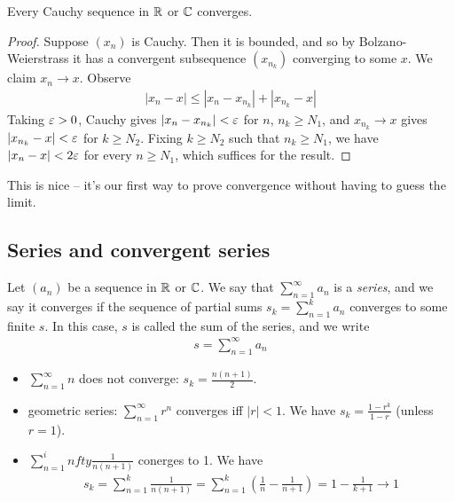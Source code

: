 \documentclass{../../template/note}
\begin{document}
    \begin{theorem}
        Every Cauchy sequence in \(\mathbb R\) or \(\mathbb C\) converges.
    \end{theorem}
    
    \begin{proof}
        Suppose \((x_n)\) is Cauchy. Then it is bounded, and so by Bolzano-Weierstrass it has a convergent subsequence \((x_{n_k})\) converging to some \(x\). We claim \(x_n \to x\). Observe
        \begin{align*}
            |x_n - x| \leq |x_n - x_{n_k}| + |x_{n_k} - x|
        \end{align*}
        Taking \(\varepsilon > 0\), Cauchy gives \(|x_n - x_{n_k}| < \varepsilon\) for \(n\), \(n_k \geq N_1\), and \(x_{n_k} \to x\) gives \(|x_{n_k} - x| < \varepsilon\) for \(k \geq N_2\). Fixing \(k \geq N_2\) such that \(n_k \geq N_1\), we have \(|x_n - x| < 2\varepsilon\) for every \(n \geq N_1\), which suffices for the result.        
    \end{proof}
    
    \begin{remark*}
        This is nice -- it's our first way to prove convergence without having to guess the limit.
    \end{remark*}
    
    \subsection{Series and convergent series}

    \begin{definition}
        Let \((a_n)\) be a sequence in \(\mathbb R\) or \(\mathbb C\). We say that \(\sum_{n=1}^\infty a_n\) is a \emph{series}, and we say it converges if the sequence of partial sums \(s_k = \sum_{n=1}^k a_n\) converges to some finite \(s\). In this case, \(s\) is called the sum of the series, and we write
        \begin{align*}
            s = \sum_{n=1}^\infty a_n
        \end{align*}        
    \end{definition}
    
    \begin{example*}
        \begin{itemize}
            \item \(\sum_{n=1}^\infty n\) does not converge: \(s_k = \frac{n(n+1)}2\).
            \item geometric series: \(\sum_{n=1}^\infty r^n\) converges iff \(|r| < 1\). We have \(s_k = \frac{1-r^k}{1-r}\) (unless \(r=1\)).
            \item \(\sum_{n=1}^infty \frac{1}{n(n+1)}\) conerges to 1. We have
            \begin{align*}
                s_k = \sum_{n=1}^k \frac{1}{n(n+1)} = \sum_{n=1}^k \left(\frac 1 n - \frac 1 {n+1}\right) = 1 - \frac{1}{k+1} \to 1
            \end{align*}
        \end{itemize}
    \end{example*}
    
\end{document}
